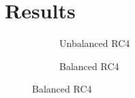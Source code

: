 \section{Results}
\begin{figure}[h]
  \centering
  \begin{subfigure}[b]{0.45\textwidth}
    \caption{Unbalanced RC4}
    \label{fig:rc4-unbalanced}
  \end{subfigure}
  \begin{subfigure}[b]{0.45\textwidth}
    \caption{Balanced RC4}
    \label{fig:rc4-balanced}
  \end{subfigure}
\end{figure}
